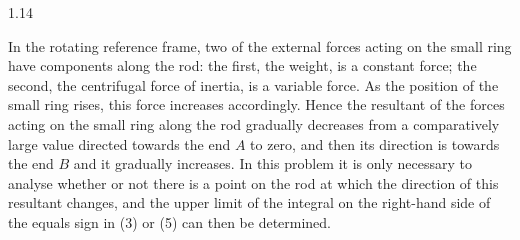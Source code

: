 \begin{solution}{1.14}
\begin{commentary}
In the rotating reference frame, two of the external forces acting on the small ring have components along the rod: the first, the weight, is a constant force; the second, the centrifugal force of inertia, is a variable force. As the position of the small ring rises, this force increases accordingly. Hence the resultant of the forces acting on the small ring along the rod gradually decreases from a comparatively large value directed towards the end $A$ to zero, and then its direction is towards the end $B$ and it gradually increases. In this problem it is only necessary to analyse whether or not there is a point on the rod at which the direction of this resultant changes, and the upper limit of the integral on the right-hand side of the equals sign in (3) or (5) can then be determined.
\end{commentary}
\end{solution}

